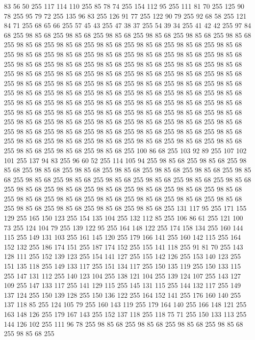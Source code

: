 83 56 50 255 117 114 110 255 85 78 74 255 154 112 95 255 111 81 70 255 125 90 78 255 95 79 72 255 135 96 83 255 126 91 77 255 122 90 79 255 92 68 58 255 121 84 71 255 68 65 66 255 57 45 43 255 47 38 37 255 54 39 34 255 41 42 42 255 97 84 68 255 98 85 68 255 98 85 68 255 98 85 68 255 98 85 68 255 98 85 68 255 98 85 68 255 98 85 68 255 98 85 68 255 98 85 68 255 98 85 68 255 98 85 68 255 98 85 68 255 98 85 68 255 98 85 68 255 98 85 68 255 98 85 68 255 98 85 68 255 98 85 68 255 98 85 68 255 98 85 68 255 98 85 68 255 98 85 68 255 98 85 68 255 98 85 68 255 98 85 68 255 98 85 68 255 98 85 68 255 98 85 68 255 98 85 68 255 98 85 68 255 98 85 68 255 98 85 68 255 98 85 68 255 98 85 68 255 98 85 68 255 98 85 68 255 98 85 68 255 98 85 68 255 98 85 68 255 98 85 68 255 98 85 68 255 98 85 68 255 98 85 68 255 98 85 68 255 98 85 68 255 98 85 68 255
98 85 68 255 98 85 68 255 98 85 68 255 98 85 68 255 98 85 68 255 98 85 68 255 98 85 68 255 98 85 68 255 98 85 68 255 98 85 68 255 98 85 68 255 98 85 68 255 98 85 68 255 98 85 68 255 98 85 68 255 98 85 68 255 98 85 68 255 98 85 68 255 98 85 68 255 98 85 68 255 98 85 68 255 98 85 68 255 98 85 68 255 98 85 68 255 98 85 68 255 98 85 68 255 98 85 68 255 98 85 68 255 98 85 68 255 100 86 68 255 103 92 89 255 107 102 101 255 137 94 83 255 96 60 52 255 114 105 94 255 98 85 68 255 98 85 68 255 98 85 68 255 98 85 68 255 98 85 68 255 98 85 68 255 98 85 68 255 98 85 68 255 98 85 68 255 98 85 68 255 98 85 68 255 98 85 68 255 98 85 68 255 98 85 68 255 98 85 68 255 98 85 68 255 98 85 68 255 98 85 68 255 98 85 68 255 98 85 68 255 98 85 68 255 98 85 68 255 98 85 68 255 98 85 68 255 98 85 68 255 98 85 68 255 98 85 68 255 98 85 68 255 98 85 68 255
98 85 68 255 98 85 68 255 131 117 95 255 171 155 129 255 165 150 123 255 154 135 104 255 132 112 85 255 106 86 61 255 121 100 73 255 124 104 79 255 139 122 95 255 164 148 122 255 174 158 134 255 160 144 115 255 149 131 103 255 161 145 120 255 179 166 141 255 160 142 115 255 164 152 132 255 186 174 151 255 187 174 152 255 155 141 118 255 91 81 70 255 143 128 111 255 152 139 123 255 154 141 127 255 155 142 126 255 153 140 123 255 151 135 118 255 149 133 117 255 151 134 117 255 150 135 119 255 150 133 115 255 147 131 112 255 140 123 104 255 138 121 104 255 139 124 107 255 143 127 109 255 147 133 117 255 141 129 115 255 145 131 115 255 144 132 117 255 149 137 124 255 150 139 128 255 150 136 122 255 164 152 141 255 176 160 140 255 137 118 85 255 124 105 79 255 160 143 119 255 179 164 140 255 166 148 121 255 163 148 126 255 179 167 143 255 152 137 118 255 118 75 71 255 150 133 113 255 144 126 102 255 111 96 78 255 98 85 68 255 98 85 68 255 98 85 68 255 98 85 68 255 98 85 68 255
